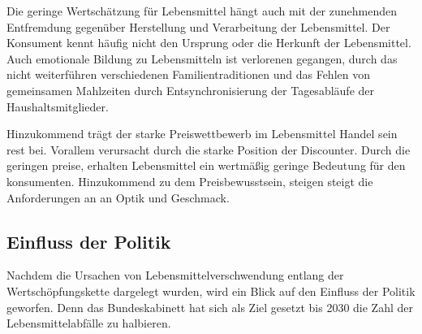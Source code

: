 Die geringe Wertschätzung für Lebensmittel hängt auch mit der zunehmenden Entfremdung gegenüber Herstellung und Verarbeitung der Lebensmittel. Der Konsument kennt häufig nicht den Ursprung oder die Herkunft der Lebensmittel. Auch emotionale Bildung zu Lebensmitteln ist verlorenen gegangen, durch das nicht weiterführen verschiedenen Familientraditionen und das Fehlen von gemeinsamen Mahlzeiten durch Entsynchronisierung der Tagesabläufe der Haushaltsmitglieder. %


Hinzukommend trägt der starke Preiswettbewerb im Lebensmittel Handel sein rest bei. Vorallem verursacht durch die starke Position der Discounter. Durch die geringen preise, erhalten Lebensmittel ein wertmäßig geringe Bedeutung für den konsumenten. Hinzukommend zu dem Preisbewusstsein, steigen steigt die Anforderungen an an Optik und Geschmack. %


\subsection{Einfluss der Politik}
Nachdem die Ursachen von Lebensmittelverschwendung entlang der Wertschöpfungskette dargelegt wurden, wird ein Blick auf den Einfluss der Politik geworfen. Denn das Bundeskabinett hat sich als Ziel gesetzt bis 2030 die Zahl der Lebensmittelabfälle zu halbieren. %

